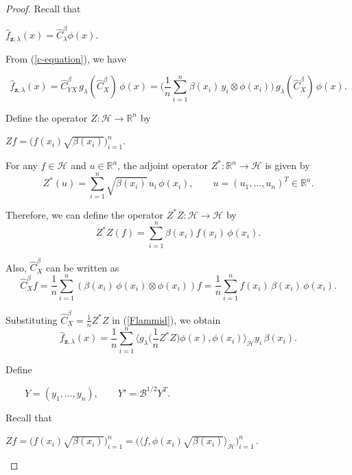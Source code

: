 \documentclass[twoside,11pt]{article}
\begin{document}
\noindent
\begin{proof}     
Recall that
\begin{center}
    $\widehat{f}_{\mathbf{z},\lambda}(x) = \widehat{C}_\lambda^\beta \phi(x).$
\end{center}

\noindent
From (\ref{c-equation}), we have

\begin{equation}\label{Flammid}
    \widehat{f}_{\mathbf{z},\lambda}(x) 
    = \widehat{C}_{YX}^\beta \, g_\lambda(\widehat{C}_X^\beta)\,\phi(x) = \Big( \frac{1}{n}\sum_{i=1}^n   \beta(x_i) \, y_i \otimes \phi(x_i) \Big)\,
       g_\lambda(\widehat{C}_X^\beta)\,\phi(x).
\end{equation}   

\noindent
Define the operator $Z : \mathcal{H} \to \mathbb{R}^n$ by
\begin{center}
    $Z f = \big( f(x_i)\sqrt{\beta(x_i)} \big)_{i=1}^n.$
\end{center}


\noindent
For any $f \in \mathcal{H}$ and $u \in \mathbb{R}^n$, the adjoint operator $Z^* : \mathbb{R}^n \to \mathcal{H}$ is given by
\[
    Z^*(u) = \sum_{i=1}^n \sqrt{\beta(x_i)}\, u_i \, \phi(x_i), 
    \qquad u = (u_1,\ldots,u_n)^T \in \mathbb{R}^n.
\]

\noindent
Therefore, we can define the operator $Z^*Z:\mathcal{H} \rightarrow\mathcal{H}$ by
\[Z^*Z(f) = \sum_{i=1}^n \beta(x_i) f(x_i)\,\phi(x_i).
\]

\noindent  
Also, $\widehat{C}_X^\beta$ can be written as
\[
\widehat{C}_X^\beta f
=
\frac{1}{n}\sum_{i=1}^n
\left( \beta(x_i)\,\phi(x_i) \otimes \phi(x_i) \right) f
=
\frac{1}{n}\sum_{i=1}^n
f(x_i)\,\beta(x_i)\,\phi(x_i).
\]


\noindent
Substituting $\widehat{C}_X^\beta = \frac{1}{n} Z^*Z$ in (\ref{Flammid}), we obtain
\[
\widehat{f}_{\mathbf z,\lambda}(x)=
\frac{1}{n}\sum_{i=1}^n
\big\langle
g_\lambda \Big(\frac{1}{n}Z^*Z\Big)\phi(x),
\phi(x_i)
\big\rangle_{\mathcal H}
y_i\,\beta(x_i).
\]




\noindent
Define 
\begin{center}
    $ 
    \qquad 
    Y = (y_1,\ldots,y_n), 
    \qquad 
    Y' =\mathcal B^{1/2}Y^T.$
\end{center}

\noindent
Recall that
\begin{center}
    $Z f = \big(f(x_i)\sqrt{\beta(x_i)}\big)_{i=1}^n 
    = \big(\langle f, \phi(x_i)\sqrt{\beta(x_i)} \rangle_{\mathcal{H}}\big)_{i=1}^n\,$.
\end{center}


\end{proof}
\end{document}
